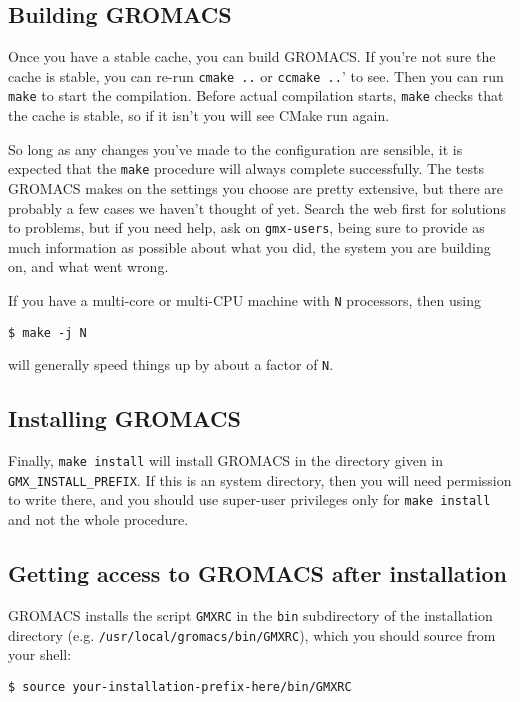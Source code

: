 \documentclass{article}[12pt,a4paper,twoside]
\newcommand{\gromacs}{GROMACS}
\newcommand{\cmake}{CMake}
\begin{document}
\subsection{Building \gromacs{}}

Once you have a stable cache, you can build \gromacs{}. If you're not
sure the cache is stable, you can re-run \verb+cmake ..+ or
\verb+ccmake ..+' to see. Then you can run \texttt{make} to start the
compilation. Before actual compilation starts, \texttt{make} checks that the
cache is stable, so if it isn't you will see \cmake{} run again.

So long as any changes you've made to the configuration are sensible,
it is expected that the \texttt{make} procedure will always complete
successfully. The tests \gromacs{} makes on the settings you choose
are pretty extensive, but there are probably a few cases we haven't
thought of yet. Search the web first for solutions to problems,
but if you need help, ask on \texttt{gmx-users}, being sure to provide
as much information as possible about what you did, the system you are
building on, and what went wrong.

If you have a multi-core or multi-CPU machine with \texttt{N}
processors, then using
\begin{verbatim}
$ make -j N
\end{verbatim}
will generally speed things up by about a factor of \texttt{N}.

\subsection{Installing \gromacs{}}

Finally, \texttt{make install} will install \gromacs{} in the
directory given in \texttt{GMX\_INSTALL\_PREFIX}. If this is an system
directory, then you will need permission to write there, and you
should use super-user privileges only for \texttt{make install} and
not the whole procedure.

\subsection{Getting access to \gromacs{} after installation}

\gromacs{} installs the script \texttt{GMXRC} in the \texttt{bin}
subdirectory of the installation directory
(e.g. \texttt{/usr/local/gromacs/bin/GMXRC}), which you should source
from your shell:
\begin{verbatim}
$ source your-installation-prefix-here/bin/GMXRC
\end{verbatim}
\end{document}
